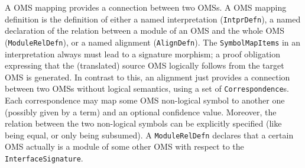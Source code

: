 \documentclass[10pt,%
\ifpretendfinal
final%
\else
draft%
\fi,
]{scrreprt}
\newcommand*{\syntax}[1]{\texttt{#1}}
\begin{document}
A OMS mapping provides a connection between two OMSs.
A OMS mapping definition is the definition of either a named interpretation
(\syntax{IntprDefn}), a named declaration of the relation between a module of an OMS and the whole OMS (\syntax{ModuleRelDefn}), or a named alignment (\syntax{AlignDefn}).
The \syntax{SymbolMapItems} in an interpretation always
must lead to a signature morphism; a proof obligation expressing
that the (translated) source OMS logically follows from
the target OMS is generated. In contrast to this,
an alignment just provides a connection between two OMSs
without logical semantics, using a set of \syntax{Correspondence}s.
Each correspondence may map some OMS non-logical symbol to another one
(possibly given by a term) and an optional confidence value.
Moreover, the relation between the two non-logical symbols can be explicitly
specified (like being equal, or only being subsumed). 
A \syntax{ModuleRelDefn} declares that a certain OMS
actually is a module of some other OMS with respect
to the \syntax{InterfaceSignature}.
\end{document}
